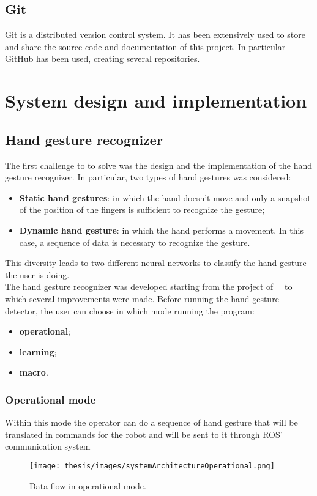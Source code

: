 \documentclass[../thesis.tex]{subfiles}
\begin{document}
\subsection{Git}
Git is a distributed version control system. It has been extensively used to store and share the source code and documentation of this project. In particular GitHub has been used, creating several repositories.

\section{System design and implementation}\label{sec:system_design_and_implementation}

\subsection{Hand gesture recognizer}
The first challenge to to solve was the design and the implementation of the hand gesture recognizer. In particular, two types of hand gestures was considered:
\begin{itemize}
    \item \textbf{Static hand gestures}: in which the hand doesn't move and only a snapshot of the position of the fingers is sufficient to recognize the gesture;
    \item \textbf{Dynamic hand gesture}: in which the hand performs a movement. In this case, a sequence of data is necessary to recognize the gesture. 
\end{itemize}
This diversity leads to two different neural networks to classify the hand gesture the user is doing.\\
The hand gesture recognizer was developed starting from the project of~\citeauthor{site:hand_gesture_base_repo}~\cite{site:hand_gesture_base_repo} to which several improvements were made. Before running the hand gesture detector, the user can choose in which mode running the program:
\begin{itemize}
    \item \textbf{operational};
    \item \textbf{learning};
    \item \textbf{macro}.
\end{itemize}

\subsubsection{Operational mode}
Within this mode the operator can do a sequence of hand gesture that will be translated in commands for the robot and will be sent to it through \acrshort{ROS}' communication system
\begin{figure}[H]
    \centering
    \texttt{[image: thesis/images/systemArchitectureOperational.png]}
    \caption{Data flow in operational mode.}
    \label{fig:system_architecture_operational}
\end{figure}
\end{document}
